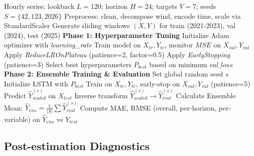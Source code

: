 \documentclass[12pt,a4paper,oneside]{report}
\begin{document}
\begin{algorithm}[H]
\caption{LSTM Direct Multi-horizon Forecasting (Tuning \& Evaluation)}
\label{alg:lstm}
\begin{algorithmic}[1]
\Require Hourly series; lookback $L=120$; horizon $H=24$; targets $V=7$; seeds $S=\{42, 123, 2026\}$
\State Preprocess: clean, decompose wind, encode time, scale via StandardScaler
\State Generate sliding windows $(X, Y)$ for train (2021-2023), val (2024), test (2025)
\State \textbf{Phase 1: Hyperparameter Tuning}
    \State Initialize Adam optimizer with \textit{learning\_rate}
    \State Train model on $X_{tr}, Y_{tr}$, monitor $MSE$ on $X_{val}, Y_{val}$
    \State Apply \textit{ReduceLROnPlateau} (patience=2, factor=0.5)
    \State Apply \textit{EarlyStopping} (patience=3)
\EndFor
\State Select best hyperparameters $P_{best}$ based on minimum $val\_loss$
\State \textbf{Phase 2: Ensemble Training \& Evaluation}
    \State Set global random seed $s$
    \State Initialize LSTM with $P_{best}$
    \State Train on $X_{tr}, Y_{tr}$, early-stop on $X_{val}, Y_{val}$ (patience=5)
    \State Predict $\hat{Y}_{scaled}^{(s)}$ on $X_{test}$
    \State Inverse transform $\hat{Y}_{scaled}^{(s)} \rightarrow \hat{Y}_{real}^{(s)}$
\EndFor
\State Calculate Ensemble Mean: $\hat{Y}_{ens} = \frac{1}{|S|} \sum \hat{Y}_{real}^{(s)}$
\State Compute MAE, RMSE (overall, per-horizon, per-variable) on $\hat{Y}_{ens}$ vs $Y_{test}$
\end{algorithmic}
\end{algorithm}

\subsection{Post-estimation Diagnostics}
\end{document}
